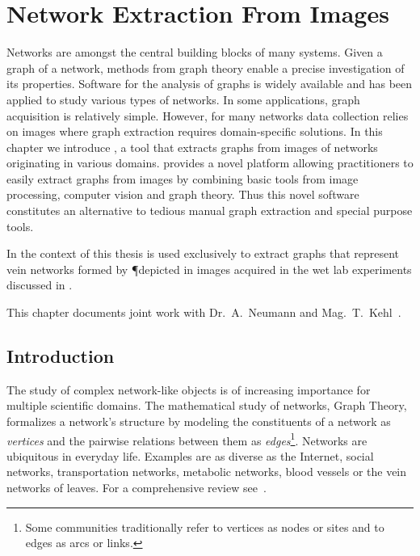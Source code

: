 \chapter{Network Extraction From Images}\label{chap:nefi}

	Networks are amongst the central building blocks of many systems. Given a graph of a network, methods from graph theory enable a precise investigation of its properties. Software for the analysis of graphs is widely available and has been applied to study various types of networks. In some applications, graph acquisition is relatively simple. However, for many networks data collection relies on images where graph extraction requires domain-specific solutions.	In this chapter we introduce \NEFI, a tool that extracts graphs from images of networks originating in various domains. \NEFI provides a novel platform allowing practitioners to easily extract graphs from images by combining basic tools from image processing, computer vision and graph theory. Thus this novel software constitutes an alternative to tedious manual graph extraction and special purpose tools. 

	In the context of this thesis \NEFI is used exclusively to extract graphs that represent vein networks formed by \P depicted in images acquired in the wet lab experiments discussed in .

	This chapter documents joint work with Dr.~A.~Neumann and Mag.~T.~Kehl~\cite{dirnberger2015nefi}.

\section{Introduction}

	The study of complex network-like objects is of increasing importance for multiple scientific domains. The mathematical study of networks, Graph Theory, formalizes a network's structure by modeling the constituents of a network as \emph{vertices} and the pairwise relations between them as \emph{edges}\footnote{Some communities traditionally refer to vertices as nodes or sites and to edges as arcs or links.}. Networks are ubiquitous in everyday life. Examples are as diverse as the Internet, social networks, transportation networks, metabolic networks, blood vessels or the vein networks of leaves. For a comprehensive review see~\cite{newman2003structure}. 

